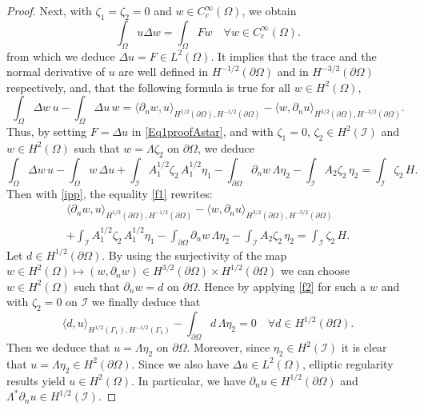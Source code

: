 \documentclass[a4paper, 12pt]{article}
\theoremstyle{plain}
\theoremstyle{definition}
\numberwithin{theorem}{section}
\numberwithin{equation}{section}
\begin{document}
{\begin{proof}
Next, with $\zeta_1=\zeta_2=0$ and $w\in C^\infty_c(\Omega)$, we obtain
$$\int_\Omega u \Delta w=\int_\Omega F w\quad \forall w\in C^\infty_c(\Omega).$$ 
from which we deduce $\Delta u=F\in L^2(\Omega)$. It implies that the trace and the normal derivative of $u$ are well defined in $H^{-1/2}(\partial\Omega)$ and in $H^{-3/2}(\partial\Omega)$ respectively, and,  that the following formula is true for all $w \in H^2(\Omega)$,
\begin{equation}\label{ipp}
\int_\Omega\Delta w\,u-\int_\Omega \Delta u\,w=\langle\partial_n w,u\rangle_{H^{1/2}(\partial\Omega),H^{-1/2}(\partial\Omega)}-\langle w,\partial_n u\rangle_{H^{3/2}(\partial\Omega),H^{-3/2}(\partial\Omega)}.
\end{equation}
Thus, by setting $F=\Delta u$ in \eqref{Eq1proofAstar}, and with $\zeta_1=0$, $\zeta_2\in H^2(\mathcal{I})$ and $w\in H^2(\Omega)$ such that $w=\Lambda \zeta_2$ on $\partial\Omega$, we deduce
\begin{equation}\label{f1}
\int_\Omega\Delta w\,u-\int_\Omega w\,\Delta u+\int_{\mathcal{I}} A_1^{1/2} \zeta_2 \, A_1^{1/2}\eta_1-\int_{\partial\Omega}\partial_n w\,\Lambda \eta_2-\int_{\mathcal{I}}A_2\zeta_2\,\eta_2=\int_{\mathcal{I}}\zeta_2\,H.
\end{equation}
Then with \eqref{ipp}, the equality \eqref{f1} rewrites:
\begin{multline}\label{f2}
\langle\partial_n w,u\rangle_{H^{1/2}(\partial\Omega),H^{-1/2}(\partial\Omega)}-\langle w,\partial_n u\rangle_{H^{3/2}(\partial\Omega),H^{-3/2}(\partial\Omega)}\\+\int_{\mathcal{I}} A_1^{1/2} \zeta_2 \, A_1^{1/2}\eta_1-\int_{\partial\Omega}\partial_n w\,\Lambda \eta_2-\int_{\mathcal{I}}A_2\zeta_2\,\eta_2=\int_{\mathcal{I}}\zeta_2\,H.
\end{multline}
Let $d\in H^{1/2}(\partial\Omega)$. By using the surjectivity of the map $w\in H^2(\Omega)\mapsto (w,\partial_n w)\in H^{3/2}(\partial\Omega)\times H^{1/2}(\partial\Omega)$ we can choose $w\in H^2(\Omega)$ such that $\partial_n w=d$ on $\partial\Omega$. Hence by applying \eqref{f2} for such a $w$ and with $\zeta_2=0$ on $\mathcal{I}$ we finally deduce that
\begin{equation}\label{f3} 
\langle d,u\rangle_{H^{1/2}(\Gamma_1),H^{-1/2}(\Gamma_1)}-\int_{\partial\Omega}d \,\Lambda \eta_2=0 \quad \forall d\in H^{1/2}(\partial\Omega).
\end{equation}
Then we deduce that $u=\Lambda \eta_2$ on $\partial\Omega$. Moreover, since $\eta_2\in H^2(\mathcal{I})$ it is clear that $u=\Lambda \eta_2\in H^{2}(\partial\Omega)$. Since we also have $\Delta u\in L^2(\Omega)$, elliptic regularity results yield $u\in H^2(\Omega)$. In particular, we have $\partial_n u\in H^{1/2}(\partial\Omega)$ and $\Lambda^*\partial_n u\in H^{1/2}(\mathcal{I})$.


\end{proof}}
\end{document}
